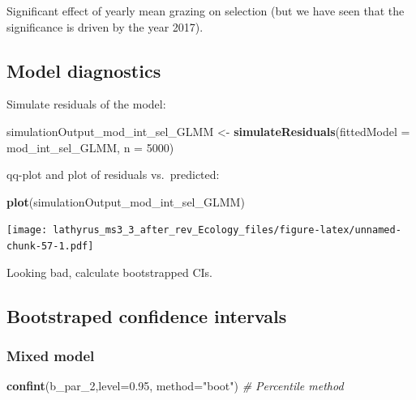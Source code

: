 \documentclass[
]{article}
\newenvironment{Shaded}{\begin{snugshade}}{\end{snugshade}}
\newcommand{\CommentTok}[1]{\textcolor[rgb]{0.56,0.35,0.01}{\textit{#1}}}
\newcommand{\DataTypeTok}[1]{\textcolor[rgb]{0.13,0.29,0.53}{#1}}
\newcommand{\DecValTok}[1]{\textcolor[rgb]{0.00,0.00,0.81}{#1}}
\newcommand{\FloatTok}[1]{\textcolor[rgb]{0.00,0.00,0.81}{#1}}
\newcommand{\KeywordTok}[1]{\textcolor[rgb]{0.13,0.29,0.53}{\textbf{#1}}}
\newcommand{\NormalTok}[1]{#1}
\newcommand{\StringTok}[1]{\textcolor[rgb]{0.31,0.60,0.02}{#1}}
\begin{document}
Significant effect of yearly mean grazing on selection (but we have seen
that the significance is driven by the year 2017).

\hypertarget{model-diagnostics-6}{%
\subsection{Model diagnostics}\label{model-diagnostics-6}}

Simulate residuals of the model:

\begin{Shaded}
\begin{Highlighting}[]
\NormalTok{simulationOutput\_mod\_int\_sel\_GLMM \textless{}{-}}\StringTok{ }
\StringTok{  }\KeywordTok{simulateResiduals}\NormalTok{(}\DataTypeTok{fittedModel =}\NormalTok{ mod\_int\_sel\_GLMM, }\DataTypeTok{n =} \DecValTok{5000}\NormalTok{)}
\end{Highlighting}
\end{Shaded}

qq-plot and plot of residuals vs.~predicted:

\begin{Shaded}
\begin{Highlighting}[]
\KeywordTok{plot}\NormalTok{(simulationOutput\_mod\_int\_sel\_GLMM)}
\end{Highlighting}
\end{Shaded}

\texttt{[image: lathyrus\_ms3\_3\_after\_rev\_Ecology\_files/figure-latex/unnamed-chunk-57-1.pdf]}

Looking bad, calculate bootstrapped CIs.

\hypertarget{bootstraped-confidence-intervals}{%
\subsection{Bootstraped confidence
intervals}\label{bootstraped-confidence-intervals}}

\hypertarget{mixed-model-1}{%
\subsubsection{Mixed model}\label{mixed-model-1}}

\begin{Shaded}
\begin{Highlighting}[]
\KeywordTok{confint}\NormalTok{(b\_par\_}\DecValTok{2}\NormalTok{,}\DataTypeTok{level=}\FloatTok{0.95}\NormalTok{, }\DataTypeTok{method=}\StringTok{"boot"}\NormalTok{) }\CommentTok{\# Percentile method}
\end{Highlighting}
\end{Shaded}
\end{document}
